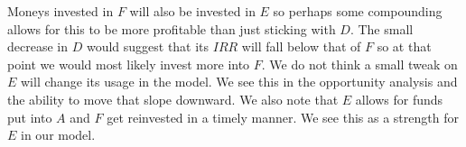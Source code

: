 \documentclass[11pt]{article}
\begin{document}
\begin{enumerate}
\begin{enumerate}
Moneys invested in $F$ will also be invested in $E$ so perhaps some compounding allows for this to be more profitable than just sticking with $D$.  The small decrease in $D$ would suggest that its $IRR$ will fall below that of $F$ so at that point we would most likely invest more into $F$.  We do not think a small tweak on $E$ will change its usage in the model.  We see this in the opportunity analysis and the ability to move that slope downward.  We also note that $E$ allows for funds put into $A$ and $F$ get reinvested in a timely manner.  We see this as a strength for $E$ in our model.
\end{enumerate}
\end{enumerate}
\end{document}
